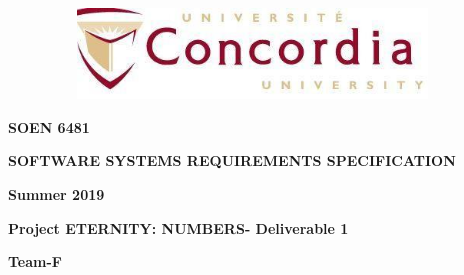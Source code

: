 \documentclass[12pt]{report}
\begin{document}

\begin{figure}[H]
	\begin{Center}
		\includegraphics[width=4.26in,height=0.95in]{./image1.jpg}
	\end{Center}
\end{figure}



\par


\vspace{\baselineskip}
\begin{Center}
{\fontsize{14pt}{16.8pt}\selectfont \textbf{\textcolor[HTML]{2F5496}{SOEN 6481}}\par}
\end{Center}\par

\begin{Center}
{\fontsize{14pt}{16.8pt}\selectfont \textbf{\textcolor[HTML]{2F5496}{SOFTWARE SYSTEMS REQUIREMENTS SPECIFICATION}}\par}
\end{Center}\par

\begin{Center}
{\fontsize{14pt}{16.8pt}\selectfont \textbf{\textcolor[HTML]{2F5496}{Summer 2019}}\par}
\end{Center}\par

\begin{Center}
{\fontsize{14pt}{16.8pt}\selectfont \textbf{\textcolor[HTML]{2F5496}{Project ETERNITY: NUMBERS- Deliverable 1}}\par}
\end{Center}\par

\begin{Center}
{\fontsize{14pt}{16.8pt}\selectfont \textbf{\textcolor[HTML]{2F5496}{Team-F}}\par}
\end{Center}\par
\end{document}
